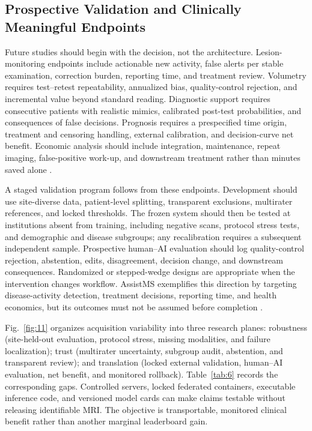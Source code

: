 \documentclass[journal,twoside,web]{ieeecolor}
\begin{document}
\subsection{Prospective Validation and Clinically Meaningful Endpoints}\label{subsec:prospective-validation-and-clinically-meaningful-endpoints}

Future studies should begin with the decision, not the architecture. Lesion-monitoring endpoints include actionable new activity, false alerts per stable examination, correction burden, reporting time, and treatment review. Volumetry requires test--retest repeatability, annualized bias, quality-control rejection, and incremental value beyond standard reading. Diagnostic support requires consecutive patients with realistic mimics, calibrated post-test probabilities, and consequences of false decisions. Prognosis requires a prespecified time origin, treatment and censoring handling, external calibration, and decision-curve net benefit. Economic analysis should include integration, maintenance, repeat imaging, false-positive work-up, and downstream treatment rather than minutes saved alone \cite{cheers_ai,sima2021}.


A staged validation program follows from these endpoints. Development should use site-diverse data, patient-level splitting, transparent exclusions, multirater references, and locked thresholds. The frozen system should then be tested at institutions absent from training, including negative scans, protocol stress tests, and demographic and disease subgroups; any recalibration requires a subsequent independent sample. Prospective human--AI evaluation should log quality-control rejection, abstention, edits, disagreement, decision change, and downstream consequences. Randomized or stepped-wedge designs are appropriate when the intervention changes workflow. AssistMS exemplifies this direction by targeting disease-activity detection, treatment decisions, reporting time, and health economics, but its outcomes must not be assumed before completion \cite{assistms}.


Fig.~\ref{fig:11} organizes acquisition variability into three research planes: robustness (site-held-out evaluation, protocol stress, missing modalities, and failure localization); trust (multirater uncertainty, subgroup audit, abstention, and transparent review); and translation (locked external validation, human--AI evaluation, net benefit, and monitored rollback). Table~\ref{tab:6} records the corresponding gaps. Controlled servers, locked federated containers, executable inference code, and versioned model cards can make claims testable without releasing identifiable MRI. The objective is transportable, monitored clinical benefit rather than another marginal leaderboard gain.
\end{document}
